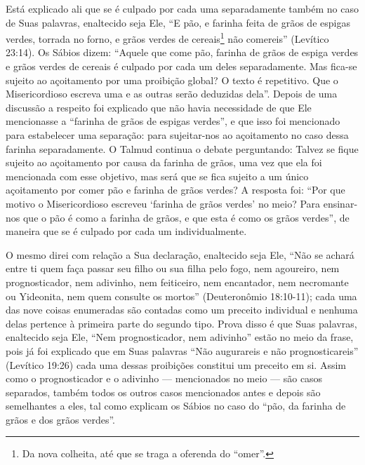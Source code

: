 Está explicado ali que se é culpado por cada uma separadamente também
no caso de Suas palavras, enaltecido seja Ele, ``E pão, e farinha feita
de grãos de espigas verdes, torrada no forno, e grãos verdes de
cereais\footnote{Da nova colheita, até que se traga a oferenda do ``omer''.} não comereis'' (Levítico 23:14). Os Sábios
dizem: ``Aquele que come pão, farinha de grãos de espiga verdes e grãos
verdes de cereais é culpado por cada um deles separadamente. Mas
fica-se sujeito ao açoitamento por uma proibição global? O texto é
repetitivo. Que o Misericordioso escreva uma e as outras serão deduzidas
dela''. Depois de uma discussão a respeito foi explicado que não havia
necessidade de que Ele mencionasse a ``farinha de grãos de espigas
verdes'', e que isso foi mencionado para estabelecer uma separação: para
sujeitar-nos ao açoitamento no caso dessa farinha separadamente. O
Talmud continua o debate perguntando: Talvez se fique sujeito ao
açoitamento por causa da farinha de grãos, uma vez que ela foi
mencionada com esse objetivo, mas será que se fica sujeito a um único
açoitamento por comer pão e farinha de grãos verdes? A resposta foi:
``Por que motivo o Misericordioso escreveu `farinha de grãos verdes' no
meio? Para ensinar-nos que o pão é como a farinha de grãos, e que esta é
como os grãos verdes'', de maneira que se é culpado por cada um
individualmente.

O mesmo direi com relação a Sua declaração, enaltecido seja Ele, ``Não
se achará entre ti quem faça passar seu filho ou sua filha pelo fogo,
nem agoureiro, nem prognosticador, nem adivinho, nem feiticeiro, nem
encantador, nem necromante ou Yideonita, nem quem consulte os mortos''
(Deuteronômio 18:10-11); cada uma das nove coisas enumeradas são
contadas como um preceito individual e nenhuma delas pertence à primeira
parte do segundo tipo. Prova disso é que Suas palavras, enaltecido seja
Ele, ``Nem prognosticador, nem adivinho'' estão no meio da frase, pois
já foi explicado que em Suas palavras ``Não augurareis e não
prognosticareis'' (Levítico 19:26) cada uma dessas proibições constitui
um preceito em si. Assim como o prognosticador e o adivinho ---
mencionados no meio --- são casos separados, também todos os outros
casos mencionados antes e depois são semelhantes a eles, tal como
explicam os Sábios no caso do ``pão, da farinha de grãos e dos grãos
verdes''.

